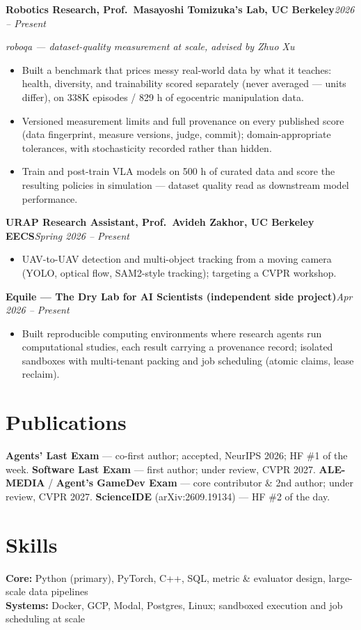 \documentclass[10pt, letterpaper]{article}
\newcommand{\role}[2]{%
  \vspace{4pt}%
  \noindent\textbf{#1}\hfill\textit{#2}\par
}
\newcommand{\rolesub}[1]{%
  \noindent\textit{#1}\par\vspace{1pt}%
}
\begin{document}
\role{Robotics Research, Prof.\ Masayoshi Tomizuka's Lab, UC Berkeley}{2026 -- Present}
\rolesub{roboqa --- dataset-quality measurement at scale, advised by Zhuo Xu}
\begin{itemize}
  \item Built a benchmark that prices messy real-world data by what it teaches: health, diversity, and trainability scored separately (never averaged --- units differ), on 338K episodes / 829 h of egocentric manipulation data.
  \item Versioned measurement limits and full provenance on every published score (data fingerprint, measure versions, judge, commit); domain-appropriate tolerances, with stochasticity recorded rather than hidden.
  \item Train and post-train VLA models on 500 h of curated data and score the resulting policies in simulation --- dataset quality read as downstream model performance.
\end{itemize}

\role{URAP Research Assistant, Prof.\ Avideh Zakhor, UC Berkeley EECS}{Spring 2026 -- Present}
\begin{itemize}
  \item UAV-to-UAV detection and multi-object tracking from a moving camera (YOLO, optical flow, SAM2-style tracking); targeting a CVPR workshop.
\end{itemize}

\role{Equile --- The Dry Lab for AI Scientists (independent side project)}{Apr 2026 -- Present}
\begin{itemize}
  \item Built reproducible computing environments where research agents run computational studies, each result carrying a provenance record; isolated sandboxes with multi-tenant packing and job scheduling (atomic claims, lease reclaim).
\end{itemize}

\section{Publications}
\textbf{Agents' Last Exam} --- co-first author; accepted, NeurIPS 2026; HF \#1 of the week. \quad \textbf{Software Last Exam} --- first author; under review, CVPR 2027. \quad \textbf{ALE-MEDIA} / \textbf{Agent's GameDev Exam} --- core contributor \& 2nd author; under review, CVPR 2027. \quad \textbf{ScienceIDE} (arXiv:2609.19134) --- HF \#2 of the day.

\section{Skills}
\textbf{Core:} Python (primary), PyTorch, C++, SQL, metric \& evaluator design, large-scale data pipelines\\[1pt]
\textbf{Systems:} Docker, GCP, Modal, Postgres, Linux; sandboxed execution and job scheduling at scale
\end{document}
